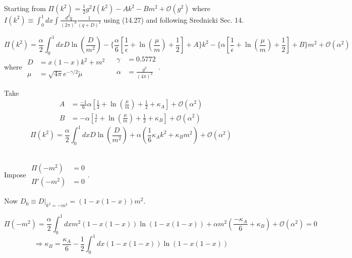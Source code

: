 \documentclass[twoside]{amsart}
\begin{document}
Starting from $\Pi(k^2) = \frac{1}{2} g^2 I(k^2) - Ak^2 - Bm^2 + \mathcal{O}(g^2)$ where $I(k^2) \equiv \int_0^1 dx \int \frac{d^d \overline{q}}{ (2\pi)^d} \frac{1}{ ( \overline{q} + D)^2 }$ using (14.27) and following Srednicki Sec. 14.  

\[
\Pi(k^2) = \frac{ \alpha}{2} \int_0^1 dx D \ln{ \left( \frac{D}{m^2} \right) } - \lbrace \frac{ \alpha}{6} \left[ \frac{1}{ \epsilon } + \ln{ \left( \frac{ \mu}{m} \right)} + \frac{1}{2} \right] + A \rbrace k^2 - \lbrace \alpha \left[ \frac{1}{ \epsilon }+ \ln{ \left( \frac{\mu}{m} \right) } + \frac{1}{2} \right] + B \rbrace m^2 + \mathcal{O}(\alpha^2) 
\]
where $ \begin{aligned} D & = x(1-x)k^2 + m^2 \\ \mu & = \sqrt{ 4\pi} e^{-\gamma/2} \widetilde{\mu} \end{aligned}$ \quad \quad \, $\begin{aligned} \gamma & = 0.5772 \\ \alpha & = \frac{ g^2}{ (4\pi)^3 } \end{aligned}$.

Take
\[
\begin{aligned}
  A & = \frac{-1}{6} \alpha \left[ \frac{1}{3} + \ln{ \left( \frac{ \mu}{ m} \right) } + \frac{1}{2} + \kappa_A \right] + \mathcal{O}(\alpha^2)  \\ 
  B & = - \alpha \left[ \frac{1}{\epsilon} + \ln{ \left( \frac{ \mu}{ m} \right) } + \frac{1}{2} + \kappa_B \right] + \mathcal{O}(\alpha^2)
\end{aligned}
\]
\[
\Pi(k^2) = \frac{ \alpha }{2} \int_0^1 dx D \ln{ \left( \frac{ D}{m^2} \right) } + \alpha \left( \frac{1}{6} \kappa_A k^2 + \kappa_B m^2\right) + \mathcal{O}(\alpha^2)
\]

 \quad \\ 

Impose  
$\begin{aligned} \Pi(-m^2) & = 0 \\ \Pi'(-m^2) & = 0 \end{aligned}$.  

Now $D_0 \equiv \left. D \right|_{k^2 = - m^2} = (1 - x(1-x))m^2$.  

\[
\Pi(-m^2) = \frac{ \alpha }{2} \int_0^1 dx m^2 ( 1 - x(1-x) ) \ln{ (1- x(1-x) ) } + \alpha m^2 \left( \frac{ - \kappa_A}{6} + \kappa_B \right) + \mathcal{O}(\alpha^2)  = 0 
\]
\[
\Longrightarrow \kappa_B = \frac{ \kappa_A}{6} - \frac{1}{2} \int_0^1 dx ( 1 - x(1-x) ) \ln{ (1-x(1-x) ) }
\]
\end{document}
